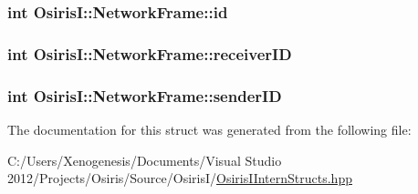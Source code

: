 \hypertarget{struct_osiris_i_1_1_network_frame_a5dbb0988b7c76dbfdbc2a8958838cbdf}{
\subsubsection[{id}]{\setlength{\rightskip}{0pt plus 5cm}int Osiris\-I\-::\-Network\-Frame\-::id}}\label{struct_osiris_i_1_1_network_frame_a5dbb0988b7c76dbfdbc2a8958838cbdf}
\hypertarget{struct_osiris_i_1_1_network_frame_afca674408d3699421b3307bfaeea0f1d}{
\subsubsection[{receiver\-I\-D}]{\setlength{\rightskip}{0pt plus 5cm}int Osiris\-I\-::\-Network\-Frame\-::receiver\-I\-D}}\label{struct_osiris_i_1_1_network_frame_afca674408d3699421b3307bfaeea0f1d}
\hypertarget{struct_osiris_i_1_1_network_frame_acbde9a1c03f58f4106d2aaadc1716f6d}{
\subsubsection[{sender\-I\-D}]{\setlength{\rightskip}{0pt plus 5cm}int Osiris\-I\-::\-Network\-Frame\-::sender\-I\-D}}\label{struct_osiris_i_1_1_network_frame_acbde9a1c03f58f4106d2aaadc1716f6d}


The documentation for this struct was generated from the following file\-:\begin{DoxyCompactItemize}
\item 
C\-:/\-Users/\-Xenogenesis/\-Documents/\-Visual Studio 2012/\-Projects/\-Osiris/\-Source/\-Osiris\-I/\hyperlink{_osiris_i_intern_structs_8hpp}{Osiris\-I\-Intern\-Structs.\-hpp}\end{DoxyCompactItemize}
